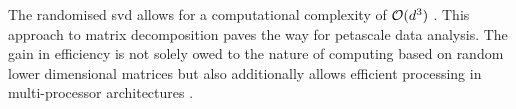 The randomised \gls{svd} allows for a computational complexity of $\mathcal{O}(d^3)$ \cite{HandsOnMLCh8}.
This approach to matrix decomposition paves the way for petascale data analysis.
The gain in efficiency is not solely owed to the nature of computing based on random lower dimensional matrices but also additionally allows efficient processing in multi-processor architectures \cite{halko2011finding}.



\clearpage

